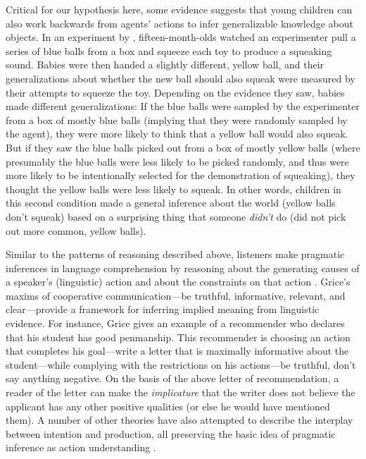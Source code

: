 \documentclass[man]{apa2}
\begin{document}
Critical for our hypothesis here, some evidence suggests that young children can also work backwards from agents' actions to infer generalizable knowledge about objects. In an experiment by , fifteen-month-olds watched an experimenter pull a series of blue balls from a box and squeeze each toy to produce a squeaking sound. Babies were then handed a slightly different, yellow ball, and their generalizations about whether the new ball should also squeak were measured by their attempts to squeeze the toy. Depending on the evidence they saw, babies made different generalizations: If the blue balls were sampled by the experimenter from a box of mostly blue balls (implying that they were randomly sampled by the agent), they were more likely to think that a yellow ball would also squeak. But if they saw the blue balls picked out from a box of mostly yellow balls (where presumably the blue balls were less likely to be picked randomly, and thus were more likely to be intentionally selected for the demonstration of squeaking), they thought the yellow balls were less likely to squeak. In other words, children in this second condition made a general inference about the world (yellow balls don't squeak) based on a surprising thing that someone \emph{didn't} do (did not pick out more common, yellow balls). 


Similar to the patterns of reasoning described above, listeners make pragmatic inferences in language comprehension by reasoning about the generating causes of a speaker's (linguistic) action and about the constraints on that action \cite{shafto2012}. Grice's \citeyear{grice1975} maxims of cooperative communication---be truthful, informative, relevant, and clear---provide a framework for inferring implied meaning from linguistic evidence. For instance, Grice gives an example of a recommender who declares that his student has good penmanship. This recommender is choosing an action that completes his goal---write a letter that is maximally informative about the student---while complying with the restrictions on his actions---be truthful, don't say anything negative. On the basis of the above letter of recommendation, a reader of the letter can make the \emph{implicature} that the writer does not believe the applicant has any other positive qualities (or else he would have mentioned them). A number of other theories have also attempted to describe the interplay between intention and production, all preserving the basic idea of pragmatic inference as action understanding \cite{horn1984,clark1996,levinson2000}. 
\end{document}
